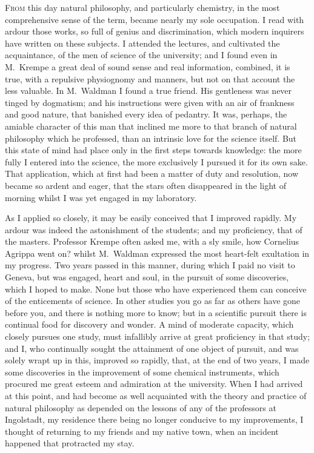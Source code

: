 \textsc{From} this day natural philosophy, and
particularly chemistry, in the most comprehensive
sense of the term, became
nearly my sole occupation. I read with
ardour those works, so full of genius and
discrimination, which modern inquirers
have written on these subjects. I attended
the lectures, and cultivated the
acquaintance, of the men of science of
the university; and I found even in
M.~Krempe a great deal of sound sense
and real information, combined, it is
true, with a repulsive physiognomy and
manners, but not on that account the
less valuable. In M.~Waldman I found
a true friend. His gentleness was never
tinged by dogmatism; and his instructions
were given with an air of
frankness and good nature, that banished
every idea of pedantry. It was,
perhaps, the amiable character of this
man that inclined me more to that
branch of natural philosophy which he
professed, than an intrinsic love for the
science itself. But this state of mind
had place only in the first steps towards
knowledge: the more fully I entered
into the science, the more exclusively
I pursued it for its own sake. That
application, which at first had been a
matter of duty and resolution, now became
so ardent and eager, that the stars
often disappeared in the light of
morning whilst I was yet engaged in my
laboratory.

As I applied so closely, it may be
easily conceived that I improved rapidly.
My ardour was indeed the astonishment
of the students; and my proficiency,
that of the masters. Professor
Krempe often asked me, with a sly
smile, how Cornelius Agrippa went on?
whilst M.~Waldman expressed the most
heart-felt exultation in my progress.
Two years passed in this manner, during
which I paid no visit to Geneva,
but was engaged, heart and soul, in the
pursuit of some discoveries, which I
hoped to make. None but those who
have experienced them can conceive of
the enticements of science. In other studies
you go as far as others have gone
before you, and there is nothing more
to know; but in a scientific pursuit
there is continual food for discovery
and wonder. A mind of moderate capacity,
which closely pursues one study,
must infallibly arrive at great proficiency
in that study; and I, who continually
sought the attainment of one
object of pursuit, and was solely wrapt
up in this, improved so rapidly, that, at
the end of two years, I made some discoveries
in the improvement of some
chemical instruments, which procured
me great esteem and admiration at the
university. When I had arrived at this
point, and had become as well acquainted
with the theory and practice
of natural philosophy as depended on
the lessons of any of the professors at
Ingolstadt, my residence there being no
longer conducive to my improvements,
I thought of returning to my friends
and my native town, when an incident
happened that protracted my stay.

